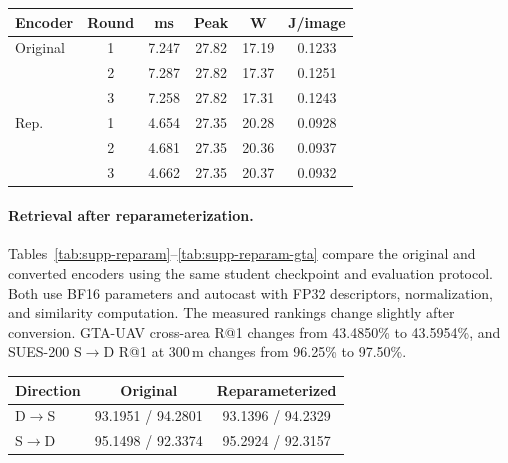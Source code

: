 \par\medskip\noindent\begin{minipage}{\columnwidth}
\captionsetup{type=table}
\centering
\caption{Jetson measurements across three rounds before and after reparameterization. Peak allocation is in MiB and energy is in J/image.}
\label{tab:supp-rounds}
{\footnotesize\setlength{\tabcolsep}{2pt}\renewcommand{\arraystretch}{1.04}
\begin{tabular*}{\columnwidth}{@{\extracolsep{\fill}}lccccc@{}}
\toprule
Encoder & Round & ms & Peak & W & J/image \\
\midrule
Original & 1 & 7.247 & 27.82 & 17.19 & 0.1233 \\
 & 2 & 7.287 & 27.82 & 17.37 & 0.1251 \\
 & 3 & 7.258 & 27.82 & 17.31 & 0.1243 \\
\midrule
Rep. & 1 & 4.654 & 27.35 & 20.28 & 0.0928 \\
 & 2 & 4.681 & 27.35 & 20.36 & 0.0937 \\
 & 3 & 4.662 & 27.35 & 20.37 & 0.0932 \\
\bottomrule
\end{tabular*}}
\end{minipage}\par\medskip

\paragraph{Retrieval after reparameterization.}
Tables~\ref{tab:supp-reparam}--\ref{tab:supp-reparam-gta} compare the original and converted encoders using the same student checkpoint and evaluation protocol. Both use BF16 parameters and autocast with FP32 descriptors, normalization, and similarity computation. The measured rankings change slightly after conversion. GTA-UAV cross-area R@1 changes from 43.4850\% to 43.5954\%, and SUES-200 S$\rightarrow$D R@1 at 300\,m changes from 96.25\% to 97.50\%.

\par\medskip\noindent\begin{minipage}{\columnwidth}
\captionsetup{type=table}
\centering
\caption{University-1652 retrieval before and after reparameterization. Cells report R@1 / AP (\%).}
\label{tab:supp-reparam}
{\footnotesize\setlength{\tabcolsep}{2pt}
\begin{tabular*}{\columnwidth}{@{\extracolsep{\fill}}lcc@{}}
\toprule
Direction & Original & Reparameterized \\
\midrule
D$\rightarrow$S & 93.1951 / 94.2801 & 93.1396 / 94.2329 \\
S$\rightarrow$D & 95.1498 / 92.3374 & 95.2924 / 92.3157 \\
\bottomrule
\end{tabular*}}
\end{minipage}\par\medskip

